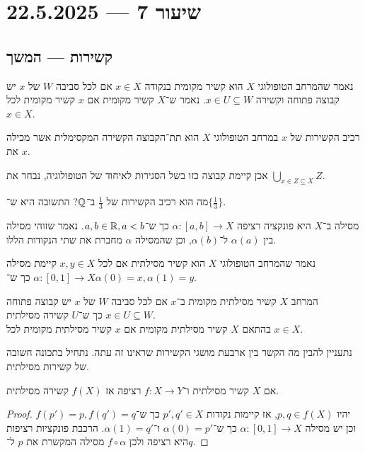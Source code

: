 \section{שיעור 7 --- 22.5.2025}
\subsection{קשירות --- המשך}
\begin{definition}
	נאמר שהמרחב הטופולוגי $X$ הוא קשיר מקומית בנקודה $x \in X$ אם לכל סביבה $W$ של $x$ יש קבוצה פתוחה וקשירה $x \in U \subseteq W$.
	נאמר ש־$X$ קשיר מקומית אם $x$ קשיר מקומית לכל $x \in X$.
\end{definition}
\begin{definition}
	רכיב הקשירות של $x$ במרחב הטופולוגי $X$ הוא תת־הקבוצה הקשירה המקסימלית אשר מכילה את $x$.
\end{definition}
\begin{remark}
	אכן קיימת קבוצה כזו בשל הסגירות לאיחוד של הטופולוגיה, נבחר את $\bigcup_{x \in Z \subseteq X} Z$.
\end{remark}
\begin{example}
	מה הוא רכיב הקשירות של $\frac{1}{3}$ ב־$\mathbb{Q}$?
	התשובה היא ש־$\{\frac{1}{3}\}$.
\end{example}
\begin{definition}[מסילה]
	מסילה ב־$X$ היא פונקציה רציפה $\alpha : [a, b] \to X$ כך ש־$a, b \in \mathbb{R}, a < b$.
	נאמר שזוהי מסילה בין $\alpha(a)$ ל־$\alpha(b)$, וכן שהמסילה $\alpha$ מחברת את שתי הנקודות הללו.
\end{definition}
\begin{definition}
	נאמר שהמרחב הטופולוגי $X$ הוא קשיר מסילתית אם לכל $x, y \in X$ קיימת מסילה $\alpha : [0, 1] \to X$ כך ש־$\alpha(0) = x, \alpha(1) = y$.
\end{definition}
\begin{definition}
	המרחב $X$ קשיר מסילתית מקומית ב־$x$ אם לכל סביבה $W$ של $x$ יש קבוצה פתוחה $x \in U \subseteq W$ כך ש־$U$ קשירה מסילתית. \\
	בהתאם $X$ קשיר מסילתית מקומית אם $x$ קשיר מסילתית מקומית לכל $x \in X$.
\end{definition}
נתעניין להבין מה הקשר בין ארבעת מושגי הקשירות שראינו זה עתה.
נתחיל בתכונה חשובה של קשירות מסילתית.
\begin{proposition}
	אם $X$ קשיר מסילתית ו־$f : X \to Y$ רציפה אז $f(X)$ קשירה מסילתית.
\end{proposition}
\begin{proof}
	יהיו $p, q \in f(X)$, אז קיימות נקודות $p', q' \in X$ כך ש־$f(p') = p, f(q') = q$ וכן יש מסילה $\alpha : [0, 1] \to X$ כך ש־$\alpha(0) = p'$ ו־$\alpha(1) = q'$.
	הרכבת פונקציות רציפות היא רציפה ולכן $f \circ \alpha$ מסילה המקשרת את $p$ ל־$q$.
\end{proof}
